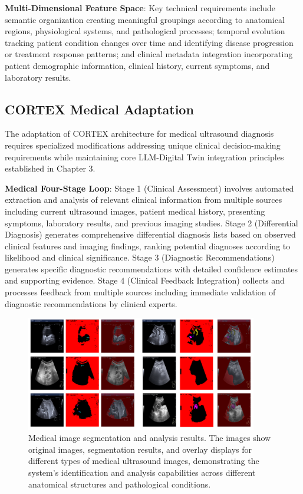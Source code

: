 \textbf{Multi-Dimensional Feature Space}: Key technical requirements include semantic organization creating meaningful groupings according to anatomical regions, physiological systems, and pathological processes; temporal evolution tracking patient condition changes over time and identifying disease progression or treatment response patterns; and clinical metadata integration incorporating patient demographic information, clinical history, current symptoms, and laboratory results.

\subsection{CORTEX Medical Adaptation}

The adaptation of CORTEX architecture for medical ultrasound diagnosis requires specialized modifications addressing unique clinical decision-making requirements while maintaining core LLM-Digital Twin integration principles established in Chapter 3.

\textbf{Medical Four-Stage Loop}: Stage 1 (Clinical Assessment) involves automated extraction and analysis of relevant clinical information from multiple sources including current ultrasound images, patient medical history, presenting symptoms, laboratory results, and previous imaging studies. Stage 2 (Differential Diagnosis) generates comprehensive differential diagnosis lists based on observed clinical features and imaging findings, ranking potential diagnoses according to likelihood and clinical significance. Stage 3 (Diagnostic Recommendations) generates specific diagnostic recommendations with detailed confidence estimates and supporting evidence. Stage 4 (Clinical Feedback Integration) collects and processes feedback from multiple sources including immediate validation of diagnostic recommendations by clinical experts.

\begin{figure}[htbp]
\centering
\includegraphics[width=0.9\textwidth]{figures/Med/medsam_result.png}
\caption{Medical image segmentation and analysis results. The images show original images, segmentation results, and overlay displays for different types of medical ultrasound images, demonstrating the system's identification and analysis capabilities across different anatomical structures and pathological conditions.}
\label{fig:medsam_result}
\end{figure}

